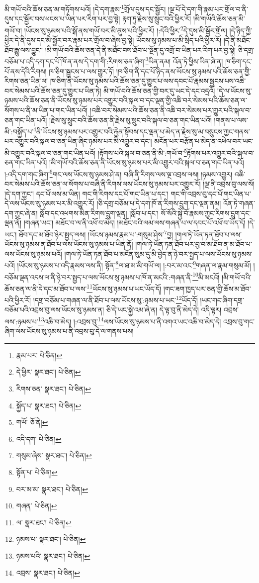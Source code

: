 མི་གཡོ་བའི་ཆོས་ཅན་མ་གཏོགས་པའོ། །དེ་དག་རྣམ་\footnote{རྣམ་པར་  པེ་ཅིན། }གྲོལ་དུས་དང་སྦྱོར། །ལྔ་པོ་དེ་དག་གི་རྣམ་པར་གྲོལ་བ་ནི་དུས་དང་སྦྱོར་བས་ཕངས་པ་ཡིན་པར་རིག་པར་བྱ་སྟེ། རྟག་ཏུ་རྗེས་སུ་སྲུང་བའི་ཕྱིར་རོ། །མི་གཡོའི་ཆོས་ཅན་མི་གཡོ་བ། །ཡོངས་སུ་ཉམས་པའི་སྒོ་ནས་གཡོ་བར་མི་ནུས་པའི་ཕྱིར་རོ། །:དེའི་ཕྱིར་\footnote{དེ་ཕྱིར་  སྣར་ཐང་།  པེ་ཅིན། }དེ་དུས་མི་སྦྱོར་གྲོལ། །དེ་ཉིད་ཀྱི་ཕྱིར་དེ་ནི་དུས་དང་མི་སྦྱོར་བར་རྣམ་པར་གྲོལ་བ་ཞེས་བྱ་སྟེ། ཡོངས་སུ་ཉམས་པ་མི་སྲིད་པའི་ཕྱིར་རོ། །དེ་ནི་མཐོང་ཐོབ་རྒྱུ་ལས་བྱུང་། །མི་གཡོ་བའི་ཆོས་ཅན་དེ་ནི་མཐོང་བས་ཐོབ་པ་སྔོན་དུ་འགྲོ་བ་ཡིན་པར་རིག་པར་བྱ་སྟེ། ཅི་དགྲ་བཅོམ་པ་འདི་དག་དང་པོ་ཁོ་ན་ནས་དེ་དག་གི་:རིགས་ཅན་ཞིག་\footnote{རིགས་ཅན་  སྣར་ཐང་།  པེ་ཅིན། }ཡིན་ནམ། འོན་ཏེ་ཕྱིས་ཡིན་ཞེ་ན། ཁ་ཅིག་དང་པོ་ནས་དེའི་རིགས། ཁ་ཅིག་སྦྱངས་པ་ལས་གྱུར་ཏོ། །ཁ་ཅིག་ནི་དང་པོ་ཉིད་ནས་ཡོངས་སུ་ཉམས་པའི་ཆོས་ཅན་གྱི་རིགས་ཅན་ཡིན་ལ། ཁ་ཅིག་ནི་ཡོངས་སུ་ཉམས་པའི་ཆོས་ཅན་དུ་གྱུར་པ་ལས་དབང་པོ་རྣམས་སྦྱངས་པས་འཆི་བར་སེམས་པའི་ཆོས་ཅན་དུ་གྱུར་པ་ཡིན་ཏེ། མི་གཡོ་བའི་ཆོས་ཅན་གྱི་བར་དུ་ཡང་དེ་དང་འདྲའོ། །དེ་ལ་ཡོངས་སུ་ཉམས་པའི་ཆོས་ཅན་ནི་ཡོངས་སུ་ཉམས་པར་འགྱུར་བའི་སྐལ་བ་དང་ལྡན་གྱི་འཆི་བར་སེམས་པའི་ཆོས་ཅན་ལ་སོགས་པ་ནི་མ་ཡིན་པ་གང་ཡིན་པའོ། །འཆི་བར་སེམས་པའི་ཆོས་ཅན་ནི་འཆི་བར་སེམས་པར་གྱུར་པའི་སྐལ་བ་ཅན་གང་ཡིན་པའོ། །རྗེས་སུ་སྲུང་བའི་ཆོས་ཅན་ནི་རྗེས་སུ་སྲུང་བའི་སྐལ་བ་ཅན་གང་ཡིན་པའོ། །གནས་པ་ལས་མི་:བསྐྱོད་པ་\footnote{སྐྱོད་པ་  སྣར་ཐང་།  པེ་ཅིན། }ནི་ཡོངས་སུ་ཉམས་པར་འགྱུར་བའི་རྐྱེན་སྟོབས་དང་ལྡན་པ་མེད་ན་རྗེས་སུ་མ་བསྲུངས་ཀྱང་གནས་པར་འགྱུར་བའི་སྐལ་བ་ཅན་ཡིན་ཞིང་ཉམས་པར་མི་འགྱུར་བ་དང་། མངོན་པར་བརྩོན་པ་མེད་ན་འཕེལ་བར་ཡང་མི་འགྱུར་བའི་སྐལ་བ་ཅན་གང་ཡིན་པའོ། །རྟོགས་པའི་སྐལ་བ་ཅན་ནི་མི་:གཡོ་བ་\footnote{གཡོ་  ཅོ་ནེ། }རྟོགས་པར་འགྱུར་བའི་སྐལ་བ་ཅན་གང་ཡིན་པའོ། །མི་གཡོ་བའི་ཆོས་ཅན་ནི་ཡོངས་སུ་ཉམས་པར་མི་འགྱུར་བའི་སྐལ་བ་ཅན་གང་ཡིན་པའོ། །:འདི་དག་གང་ཞིག་\footnote{འདི་དག་  པེ་ཅིན། }གང་ལས་ཡོངས་སུ་ཉམས་ཤེ་ན། བཞི་ནི་རིགས་ལས་ལྔ་འབྲས་ལས། །ཉམས་འགྱུར། འཆི་བར་སེམས་པའི་ཆོས་ཅན་ལ་སོགས་པ་བཞི་ནི་རིགས་ལས་ཡོངས་སུ་ཉམས་པར་འགྱུར་རོ། །ལྔ་ནི་འབྲས་བུ་ལས་སོ། །དེ་དག་ཀྱང་། དང་པོ་ལས་མ་ཡིན། གང་གི་རིགས་དང་པོ་གང་ཡིན་པ་དང་། གང་གི་འབྲས་བུ་དང་པོ་གང་ཡིན་པ་དེ་ལས་ཡོངས་སུ་ཉམས་པར་མི་འགྱུར་རོ། །ཅི་དགྲ་བཅོམ་པ་དེ་དག་ཁོ་ན་རིགས་དྲུག་དང་ལྡན་ནམ། འོན་ཏེ་གཞན་དག་ཀྱང་ཞེ་ན། སློབ་དང་འཕགས་མིན་རིགས་དྲུག་ལྡན། །སློབ་པ་དང་། སོ་སོའི་སྐྱེ་བོ་རྣམས་ཀྱང་རིགས་དྲུག་དང་ལྡན་ནོ། །གཞན་ཡང་། མཐོང་བ་ལ་ནི་འཕོ་བ་མེད། །མཐོང་བའི་ལམ་ལས་གཞན་པ་ལ་དབང་པོ་འཕོ་བ་ཡོད་དོ། །དེ་ཡང་། ཐོབ་དང་མ་ཐོབ་ཉེར་སྤྱད་ལས། །ཡོངས་ཉམས་རྣམ་པ་:གསུམ་ཤེས་\footnote{གསུམ་ཞེས་  སྣར་ཐང་།  པེ་ཅིན། }བྱ། །གལ་ཏེ་ཡོན་ཏན་ཐོབ་པ་ལས་ཡོངས་སུ་ཉམས་ན་ཐོབ་པ་ལས་ཡོངས་སུ་ཉམས་པ་ཡིན་ནོ། །གལ་ཏེ་ཡོན་ཏན་ཐོབ་པར་བྱ་བ་མ་ཐོབ་ན་མ་ཐོབ་པ་ལས་ཡོངས་སུ་ཉམས་པའོ། །གལ་ཏེ་ཡོན་ཏན་ཐོབ་པ་མངོན་སུམ་དུ་མི་བྱེད་ན་ཉེ་བར་སྤྱད་པ་ལས་ཡོངས་སུ་ཉམས་པའོ། །ཡོངས་སུ་ཉམས་པ་འདི་རྣམས་ལས་ནི། སྟོན་\footnote{སྟོན་པ་  པེ་ཅིན། }ལ་ཐ་མ་མི་གཡོ་ལ། །:བར་མ་འང་\footnote{བར་མ་མ་  སྣར་ཐང་།  པེ་ཅིན། }གཞན་ལ་རྣམ་གསུམ་མོ། །བཅོམ་ལྡན་འདས་ལ་ནི་ཉེ་བར་སྤྱད་པ་ལས་ཡོངས་སུ་ཉམས་པ་ཁོ་ན་མངའི་:གཞན་ནི་\footnote{གཞན་  པེ་ཅིན། }མི་མངའོ། །མི་གཡོ་བའི་ཆོས་ཅན་ལ་ནི་དེ་དང་མ་ཐོབ་པ་ལས་\footnote{ལ་  སྣར་ཐང་།  པེ་ཅིན། }ཡོངས་སུ་ཉམས་པ་ཡང་ཡོད་དོ། །གང་ཟག་ཁྱད་པར་ཅན་གྱི་ཆོས་མ་ཐོབ་པའི་ཕྱིར་རོ། །དགྲ་བཅོམ་པ་གཞན་ལ་ནི་ཐོབ་པ་ལས་ཡོངས་སུ་:ཉམས་པ་ཡང་\footnote{ཉམས་པ་  སྣར་ཐང་།  པེ་ཅིན། }ཡོད་དོ། །ཡང་གང་ཞིག་དགྲ་བཅོམ་པའི་འབྲས་བུ་ལས་ཡོངས་སུ་ཉམས་ན། ཅི་དེ་ཡང་སྐྱེ་འམ་ཞེ་ན། དེ་ལྟ་བུ་ནི་མེད་དེ། འདི་ལྟར། འབྲས་ལས་:ཉམས་པ་\footnote{ཉམས་པའི་  སྣར་ཐང་།  པེ་ཅིན། }འཆི་བ་མེད། །:འབྲས་བུ་\footnote{འབྲས་  སྣར་ཐང་།  པེ་ཅིན། }ལས་ཡོངས་སུ་ཉམས་པ་ནི་འགའ་ཡང་འཆི་བ་མེད་དེ། འབྲས་བུ་གང་ཞིག་ལས་ཡོངས་སུ་ཉམས་པ་ནི་འབྲས་བུ་དེ་ལ་གནས་པས། 